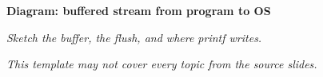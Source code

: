 \documentclass[14pt]{extarticle}
\begin{document}
\noindent\textbf{Diagram: buffered stream from program to OS}
\begin{framed}
\begin{minipage}[t][0.28\textheight]{\textwidth}
\vspace{0.5em}
\textit{Sketch the buffer, the flush, and where printf writes.}
\end{minipage}
\end{framed}

\vspace{2em}
\begin{center}
\textit{This template may not cover every topic from the source slides.}
\end{center}
\end{document}
